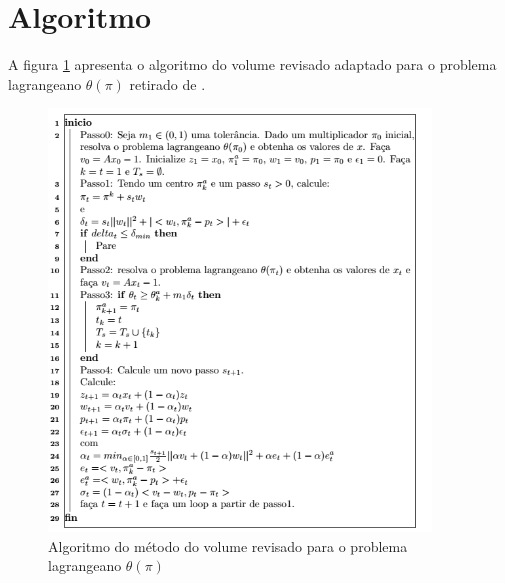 \section{Algoritmo}\label{sec:algoritmo} 
A figura \ref{AlgoritmoVolume} apresenta o algoritmo do volume revisado adaptado para o problema lagrangeano
$ \theta (\pi)$ retirado de \cite{Bahiense02}. 
\begin{figure}
\centering
\includegraphics[width=4in]{AlgoritmoVolume.PNG}
\caption{Algoritmo do método do volume revisado para o problema lagrangeano $ \theta (\pi)$}
\label{AlgoritmoVolume}
\end{figure}